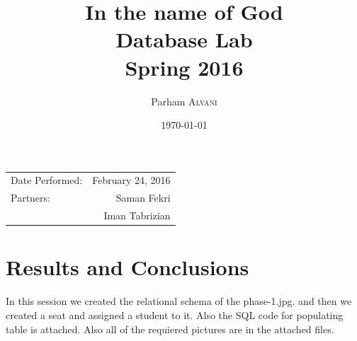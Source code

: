 \documentclass{article}
\title{In the name of God \\ Database Lab \\ Spring 2016} %
\author{Parham \textsc{Alvani}} %
\date{\today} %
\begin{document}
\maketitle %

\begin{center}
\begin{tabular}{l r}
	Date Performed: & February 24, 2016 \\ %
	Partners: & Saman Fekri \\ %
		  & Iman Tabrizian \\
\end{tabular}
\end{center}



\section{Results and Conclusions}

In this session we created the relational schema of the phase-1.jpg.
and then we created a seat and assigned a student to it. Also the SQL code for
populating table is attached. Also all of the requiered pictures are in the attached
files.
\end{document}
